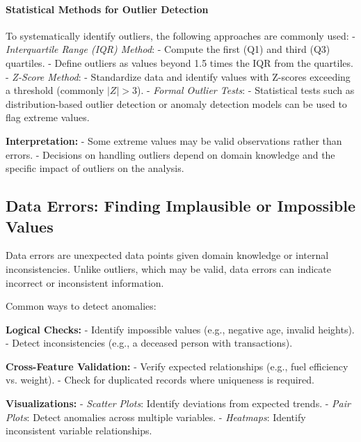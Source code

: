 \documentclass[12pt,openany, draft]{book}
\begin{document}
\paragraph{Statistical Methods for Outlier Detection}
To systematically identify outliers, the following approaches are commonly used:
\newline
- \textit{Interquartile Range (IQR) Method}:  
  - Compute the first (Q1) and third (Q3) quartiles.  
  - Define outliers as values beyond 1.5 times the IQR from the quartiles.  
\newline
- \textit{Z-Score Method}:  
  - Standardize data and identify values with Z-scores exceeding a threshold 
    (commonly \( |Z| > 3 \)).  
\newline
- \textit{Formal Outlier Tests}:  
  - Statistical tests such as distribution-based outlier detection or 
    anomaly detection models can be used to flag extreme values.
\newline

\textbf{Interpretation:}  
\newline
- Some extreme values may be valid observations rather than errors.  
- Decisions on handling outliers depend on domain knowledge and the specific 
  impact of outliers on the analysis.  
\newline


\subsection{Data Errors: Finding Implausible or Impossible Values}

Data errors are unexpected data points given domain knowledge or internal inconsistencies. Unlike outliers, which may be valid, data errors can indicate incorrect or inconsistent information.
\newline

Common ways to detect anomalies:
\newline

\textbf{Logical Checks:}
- Identify impossible values (e.g., negative age, invalid heights).
- Detect inconsistencies (e.g., a deceased person with transactions).
\newline

\textbf{Cross-Feature Validation:}
- Verify expected relationships (e.g., fuel efficiency vs. weight).
- Check for duplicated records where uniqueness is required.
\newline

\textbf{Visualizations:}
- \textit{Scatter Plots}: Identify deviations from expected trends.
- \textit{Pair Plots}: Detect anomalies across multiple variables.
- \textit{Heatmaps}: Identify inconsistent variable relationships.
\newline
\end{document}
